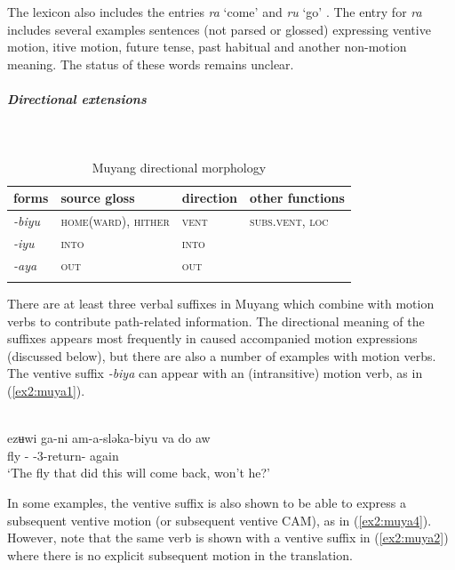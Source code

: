 The lexicon also includes the entries \textit{ra} `come' and \textit{ru} `go'  \citep[76--77]{smithMuyangProvisionalLexicon2003}. The entry for \textit{ra} includes several examples sentences (not parsed or glossed) expressing ventive motion, itive motion, future tense, past habitual and another non-motion meaning. The status of these words remains unclear.

\subparagraph{Directional extensions}~

\begin{table}[H]
	\caption{Muyang directional morphology}
	\label{tab:muya}
	\begin{tabular}{llll} %
		\lsptoprule
		forms & source gloss & direction  & other functions  \\ %
		\midrule
		\textit{-biyu}  &  \textsc{home(ward), hither}  &  \textsc{vent} &   \textsc{subs.vent}, \textsc{loc} \\
		\textit{-iyu}  &  \textsc{into}  & \textsc{into}  &    \\
		\textit{-aya}  &  \textsc{out}  & \textsc{out}  &    \\
		\lspbottomrule
	\end{tabular}
\end{table} 

There are at least three verbal suffixes in Muyang which combine with motion verbs to contribute path-related information. The directional meaning of the suffixes appears most frequently in caused accompanied motion expressions (discussed below), but there are also a number of examples with motion verbs. The ventive suffix \textit{-biya} can appear with an (intransitive) motion verb, as in (\ref{ex2:muya1}). 

\ea\label{ex2:muya1}
 \\
\gll ezʉwi ga-ni am-a-sləka-biyu va do aw  \\
fly - -3-return- again   \\
\glt `The fly that did this will come back, won't he?'
\z 

In some examples, the ventive suffix is also shown to be able to express a subsequent ventive motion (or subsequent ventive CAM), as in (\ref{ex2:muya4}). However, note that the same verb is shown with a ventive suffix in (\ref{ex2:muya2}) where there is no explicit subsequent motion in the translation.

